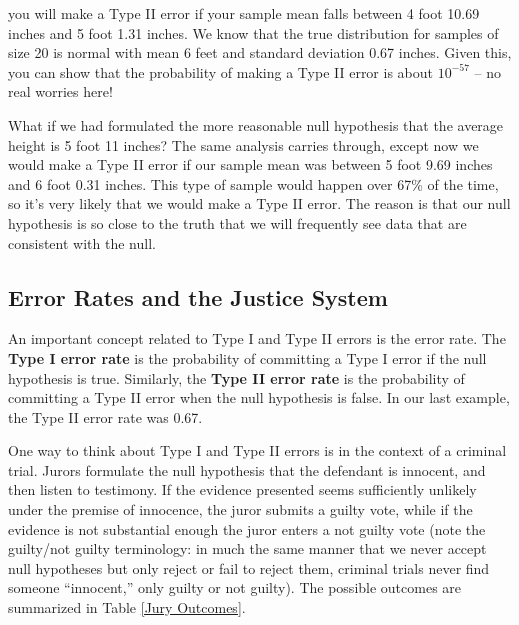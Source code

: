 you will make a Type II error if your sample mean falls between 4 foot 10.69 inches and 5 foot 1.31 inches. We know that the true distribution for samples of size 20 is normal with mean 6 feet and standard deviation 0.67 inches. Given this, you can show that the probability of making a Type II error is about $10^{-57}$ -- no real worries here!



What if we had formulated the more reasonable null hypothesis that the average height is 5 foot 11 inches? The same analysis carries through, except now we would make a Type II error if our sample mean was between 5 foot 9.69 inches and 6 foot 0.31 inches. This type of sample would happen over 67\% of the time, so it's very likely that we would make a Type II error. The reason is that our null hypothesis is so close to the truth that we will frequently see data that are consistent with the null.











\subsection{Error Rates and the Justice System}



An important concept related to Type I and Type II errors is the error rate.  The \textbf{Type I error rate}  is the probability of committing a Type I error if the null hypothesis is true.  Similarly, the \textbf{Type II error rate}  is the probability of committing a Type II error when the null hypothesis is false.  In our last example, the Type II error rate was 0.67.



One way to think about Type I and Type II errors is in the context of a criminal trial. Jurors formulate the null hypothesis that the defendant is innocent, and then listen to testimony. If the evidence presented seems sufficiently unlikely under the premise of innocence, the juror submits a guilty vote, while if the evidence is not substantial enough the juror enters a not guilty vote (note the guilty/not guilty terminology: in much the same manner that we never accept null hypotheses but only reject or fail to reject them, criminal trials never find someone ``innocent,'' only guilty or not guilty). The possible outcomes are summarized in Table \ref{Jury Outcomes}.



